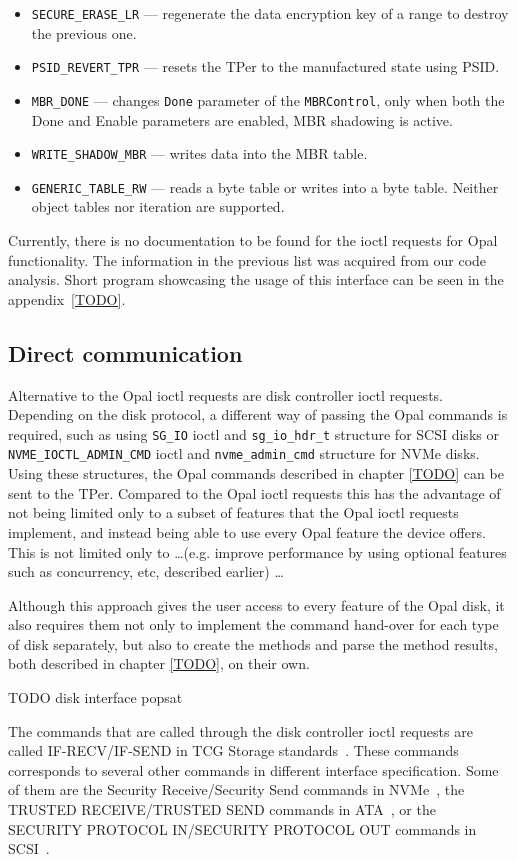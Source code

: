 \begin{itemize}
\item \verb|SECURE_ERASE_LR| --- regenerate the data encryption key of a range to destroy the previous one.
\item \verb|PSID_REVERT_TPR| --- resets the TPer to the manufactured state using PSID.
\item \verb|MBR_DONE| --- changes \verb|Done| parameter of the \verb|MBRControl|, only when both the Done and Enable parameters are enabled, MBR shadowing is active.
\item \verb|WRITE_SHADOW_MBR| --- writes data into the MBR table.
\item \verb|GENERIC_TABLE_RW| --- reads a byte table or writes into a byte table. Neither object tables nor iteration are supported.
\end{itemize}

Currently, there is no documentation to be found for the ioctl requests for Opal functionality. The information in the previous list was acquired from our code analysis.
Short program showcasing the usage of this interface can be seen in the appendix~\ref{TODO}.

\subsection{Direct communication}
\label{direct_communication_raw_ioctl}

Alternative to the Opal ioctl requests are disk controller ioctl requests. Depending on the disk protocol, a different way of passing the Opal commands is required, such as using \verb|SG_IO| ioctl and \verb|sg_io_hdr_t| structure for SCSI disks or \verb|NVME_IOCTL_ADMIN_CMD| ioctl and \verb|nvme_admin_cmd| structure for NVMe disks. Using these structures, the Opal commands described in chapter \ref{TODO} can be sent to the TPer. Compared to the Opal ioctl requests this has the advantage of not being limited only to a subset of features that the Opal ioctl requests implement, and instead being able to use every Opal feature the device offers. This is not limited only to \dots (e.g. improve performance by using optional features such as concurrency, etc, described earlier) \dots

Although this approach gives the user access to every feature of the Opal disk, it also requires them not only to implement the command hand-over for each type of disk separately, but also to create the methods and parse the method results, both described in chapter \ref{TODO}, on their own.

TODO disk interface popsat\cite{NVME}

The commands that are called through the disk controller ioctl requests are called IF-RECV/IF-SEND in TCG Storage standards~\cite{tcg-storage-core}. These commands corresponds to several other commands in different interface specification. Some of them are the Security Receive/Security Send commands in NVMe~\cite{nvme-express-base-specification}, the TRUSTED RECEIVE/TRUSTED SEND commands in ATA~\cite{acs-3}, or the SECURITY PROTOCOL IN/SECURITY PROTOCOL OUT commands in SCSI~\cite{spc-4}.


 